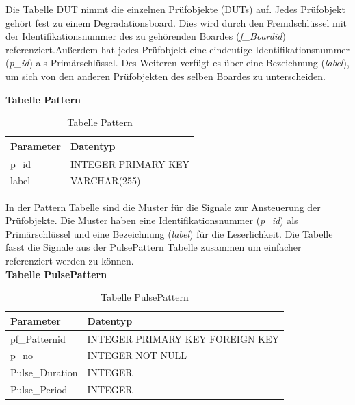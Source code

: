 Die Tabelle DUT nimmt die einzelnen Prüfobjekte (\acp{DUT}) auf. Jedes Prüfobjekt gehört fest zu einem Degradationsboard. Dies wird durch den Fremdschlüssel mit der Identifikationsnummer des zu gehörenden Boardes (\textit{f\_Boardid}) referenziert.Außerdem hat jedes Prüfobjekt eine eindeutige Identifikationsnummer (\textit{p\_id}) als Primärschlüssel. Des Weiteren verfügt es über eine Bezeichnung (\textit{label}), um sich von den anderen Prüfobjekten des selben Boardes zu unterscheiden.



\textbf{Tabelle Pattern}\\

\begin{table}[H]
\begin{center}
\begin{tabular}{|l|l|}\hline
Parameter & Datentyp \\ \hline
p\_id & INTEGER PRIMARY KEY\\ 
label & VARCHAR(255)\\ \hline
\end{tabular}
\caption{Tabelle Pattern}
\label{table_TabellePattern}
\end{center}
\end{table}

In der Pattern Tabelle sind die Muster für die Signale zur Ansteuerung der Prüfobjekte. Die Muster haben eine Identifikationsnummer (\textit{p\_id}) als Primärschlüssel und eine Bezeichnung (\textit{label}) für die Leserlichkeit. Die Tabelle fasst die Signale aus der PulsePattern Tabelle zusammen um einfacher referenziert werden zu können.\\

\textbf{Tabelle PulsePattern}\\

\begin{table}[H]
\begin{center}
\begin{tabular}{|l|l|}\hline
Parameter & Datentyp \\ \hline
pf\_Patternid & INTEGER PRIMARY KEY FOREIGN KEY\\ 
p\_no & INTEGER NOT NULL\\
Pulse\_Duration & INTEGER\\
Pulse\_Period & INTEGER\\ \hline
\end{tabular}
\caption{Tabelle PulsePattern}
\label{table_TabellePulsePattern}
\end{center}
\end{table}

